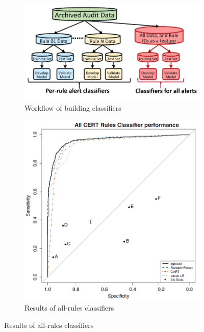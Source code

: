 \documentclass{article}
\begin{document}
 \begin{figure}[H]
     \begin{subfigure}{.5\textwidth}
         \centering
         \includegraphics[scale=0.3]{./src/multiple_classifiers_workflow.png}
         \caption{Workflow of building classifiers}\label{multiple_classifiers:workflow}
     \end{subfigure}%
     \begin{subfigure}{.5\textwidth}
         \centering
         \includegraphics[scale=0.3]{./src/multiple_classifiers_resulst.png}
         \caption{Results of all-rules classifiers}\label{multiple_classifiers:results}
     \end{subfigure}
 \end{figure}
\end{document}
